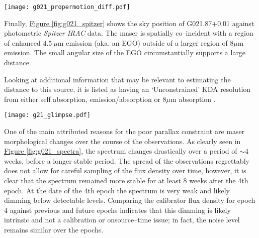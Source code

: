             \begin{SCfigure}
            	\centering
            	\texttt{[image: g021\_propermotion\_diff.pdf]}
            	\caption[Proper motion distance G021.87$+$0.01]{Modelled proper motion distance for G021.87$+$0.01 vs. residual velocity. \textbf{Solid line:} Upper 95\% CI limit with $\mu_l = -6.4$\,mas/yr; \textbf{Dashed line:} Lower 95\% CI with $\mu_l = -8.2$\,mas/yr. \textbf{Green region:} acceptable velocity differences bounded by $\pm10$\,\kms.} \label{fig:g021_tangentvel}
            \end{SCfigure}
            
            Finally, \hyperref[fig:g021_spitzer]{Figure \ref*{fig:g021_spitzer}} shows the sky position of G021.87$+$0.01 against photometric \textit{Spitzer IRAC} data. The maser is spatially co--incident with a region of enhanced $4.5~\mu$m emission (aka. an EGO) outside of a larger region of $8\mu$m emission. The small angular size of the EGO circumstantially supports a large distance. 
            
            Looking at additional information that may be relevant to estimating the distance to this source, it is listed as having an `Unconstrained' KDA resolution from either \hi\space self absorption, emission/absorption or $8\mu$m absorption \citep{Ellsworth2015}.
                        
		    \begin{SCfigure}
			    \centering
		     	\texttt{[image: g21\_glimpse.pdf]}
		        \caption[G021.87$+$0.01 Sky position]{Astrometric position of \water\space maser G021.87$+$0.01 against {\it Spitzer} GLIMPSE data. \textbf{Blue star:} position of G021.87$+$0.01 $l=21.87977$, $b=0.01401$~deg. \textbf{RGB image:} $8$, $4.5$ and $3.6\mu$m emission. } \label{fig:g021_spitzer}
		    \end{SCfigure}
            
            One of the main attributed reasons for the poor parallax constraint are maser morphological changes over the course of the observations. As clearly seen in \hyperref[fig:g021_spectra]{Figure \ref*{fig:g021_spectra}}, the spectrum changes drastically over a period of $\sim4$\,weeks, before a longer stable period. The spread of the observations regrettably does not allow for careful sampling of the flux density over time, however, it is clear that the spectrum remained more stable for at least 8 weeks after the 4th epoch. At the date of the 4th epoch the spectrum is very weak and likely dimming below detectable levels. Comparing the calibrator flux density for epoch 4 against previous and future epochs indicates that this dimming is likely intrinsic and not a calibration or onsource--time issue; in fact, the noise level remains similar over the epochs. 
            
